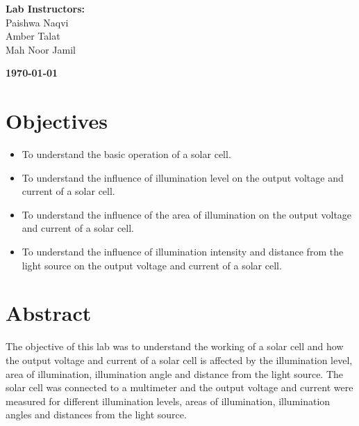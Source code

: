 \documentclass[a4paper, 12pt, english]{article}
\begin{document}
\begin{titlepage}
\begin{center}
		\vspace{45pt}
		\textbf {\large Lab Instructors:}\\[0.2cm]
		\Large {Paishwa Naqvi}\\[0.1cm]
		\Large {Amber Talat}\\[0.1cm]
		\Large {Mah Noor Jamil}\\[0.1cm]
	\end{center}

	\par
	\vfill
	\begin{center}
		\textbf{\today}\\
	\end{center}

\end{titlepage}



\newpage
\section{Objectives}
\begin{itemize}
	\item To understand the basic operation of a solar cell.
	\item To understand the influence of illumination level on the output voltage and
	      current of a solar cell.
	\item To understand the influence of the area of illumination on the output voltage
	      and current of a solar cell.
	\item To understand the influence of illumination intensity and distance from the
	      light source on the output voltage and current of a solar cell.
\end{itemize}

\section{Abstract}
The objective of this lab was to understand the working of a solar cell and how
the output voltage and current of a solar cell is affected by the illumination
level, area of illumination, illumination angle and distance from the light
source. The solar cell was connected to a multimeter and the output voltage and
current were measured for different illumination levels, areas of illumination,
illumination angles and distances from the light source.
\end{document}
